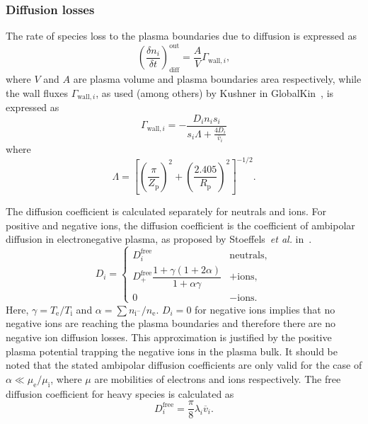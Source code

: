 \subsubsection{Diffusion losses}
The rate of species loss to the plasma boundaries due to diffusion is expressed as
\begin{equation}
    \left( \frac{\delta n_{i}}{\delta t} \right)_{\mathrm{diff}}^{\mathrm{out}} =
    \frac{A}{V} \Gamma_{\mathrm{wall}, i},
\end{equation}
where $V$ and $A$ are plasma volume and plasma boundaries area respectively, while the wall fluxes
$\Gamma_{\mathrm{wall}, i}$, as used (among others) by Kushner in GlobalKin~\cite{schroter_numerical_2018},
is expressed as
\begin{equation}
    \Gamma_{\mathrm{wall}, i} = - \frac{D_i n_i s_i}{s_i \Lambda + \frac{4 D_i}{\overline{v}_{i}}}
\end{equation}
where
\begin{equation}
    \Lambda =
    \left[
        \left( \frac{\pi}{Z_{\mathrm{p}}} \right)^{2} + \left( \frac{2.405}{R_{\mathrm{p}}} \right)^{2}
    \right]^{-1/2}.
\end{equation}

The diffusion coefficient is calculated separately for neutrals and ions.
For positive and negative ions, the diffusion coefficient is the coefficient of ambipolar diffusion in
electronegative plasma, as proposed by Stoeffels~\emph{et al.} in~\cite{stoffels_negative_1995}.
\begin{equation}
    D_{i} =
    \begin{cases}
        D_{i}^{\mathrm{free}} & \mathrm{neutrals}, \\
        D_{+}^{\mathrm{free}} \dfrac{1 + \gamma (1 + 2 \alpha)}{1 + \alpha \gamma} & \mathrm{+ions}, \\
        0 & \mathrm{-ions}.
    \end{cases}
\end{equation}
Here, $\gamma = T_{\mathrm{e}}/T_{\mathrm{i}}$ and $\alpha = \sum n_{\mathrm{i^{-}}} / n_{\mathrm{e}}$.
$D_{i} = 0$ for negative ions implies that no negative ions are reaching the plasma boundaries and therefore there
are no negative ion diffusion losses.
This approximation is justified by the positive plasma potential trapping the negative ions in the plasma bulk.
It should be noted that the stated ambipolar diffusion coefficients are only valid for the case of
$\alpha \ll \mu_{\mathrm{e}} / \mu_{\mathrm{i}}$, where $\mu$ are mobilities of electrons and ions respectively.
The free diffusion coefficient for heavy species is calculated as
\begin{equation}
    D_{i}^{\mathrm{free}} = \frac{\pi}{8} \lambda_{i} \overline{v}_{i}.
\end{equation}

